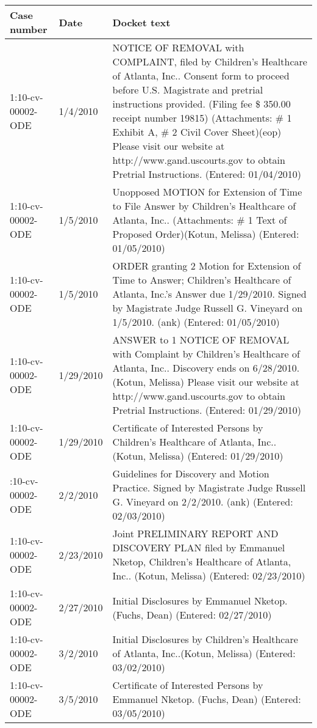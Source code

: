 
\begin{longtable}{ll>{\raggedright\arraybackslash}p{30em}}
\toprule
Case number & Date & Docket text\\
\midrule
1:10-cv-00002-ODE & 1/4/2010 & NOTICE OF REMOVAL with COMPLAINT, filed by Children's Healthcare of Atlanta, Inc.. Consent form to proceed before U.S. Magistrate and pretrial instructions provided. (Filing fee \$ 350.00 receipt number 19815) (Attachments: \# 1 Exhibit A, \# 2 Civil Cover Sheet)(eop) Please visit our website at http://www.gand.uscourts.gov to obtain Pretrial Instructions. (Entered: 01/04/2010)\\
1:10-cv-00002-ODE & 1/5/2010 & Unopposed MOTION for Extension of Time to File Answer by Children's Healthcare of Atlanta, Inc.. (Attachments: \# 1 Text of Proposed Order)(Kotun, Melissa) (Entered: 01/05/2010)\\
1:10-cv-00002-ODE & 1/5/2010 & ORDER granting 2 Motion for Extension of Time to Answer; Children's Healthcare of Atlanta, Inc.'s Answer due 1/29/2010. Signed by Magistrate Judge Russell G. Vineyard on 1/5/2010. (ank) (Entered: 01/05/2010)\\
1:10-cv-00002-ODE & 1/29/2010 & ANSWER to 1 NOTICE OF REMOVAL with Complaint by Children's Healthcare of Atlanta, Inc.. Discovery ends on 6/28/2010.(Kotun, Melissa) Please visit our website at http://www.gand.uscourts.gov to obtain Pretrial Instructions. (Entered: 01/29/2010)\\
1:10-cv-00002-ODE & 1/29/2010 & Certificate of Interested Persons by Children's Healthcare of Atlanta, Inc.. (Kotun, Melissa) (Entered: 01/29/2010)\\
\addlinespace
1:10-cv-00002-ODE & 2/2/2010 & Guidelines for Discovery and Motion Practice. Signed by Magistrate Judge Russell G. Vineyard on 2/2/2010. (ank) (Entered: 02/03/2010)\\
1:10-cv-00002-ODE & 2/23/2010 & Joint PRELIMINARY REPORT AND DISCOVERY PLAN filed by Emmanuel Nketop, Children's Healthcare of Atlanta, Inc.. (Kotun, Melissa) (Entered: 02/23/2010)\\
1:10-cv-00002-ODE & 2/27/2010 & Initial Disclosures by Emmanuel Nketop.(Fuchs, Dean) (Entered: 02/27/2010)\\
1:10-cv-00002-ODE & 3/2/2010 & Initial Disclosures by Children's Healthcare of Atlanta, Inc..(Kotun, Melissa) (Entered: 03/02/2010)\\
1:10-cv-00002-ODE & 3/5/2010 & Certificate of Interested Persons by Emmanuel Nketop. (Fuchs, Dean) (Entered: 03/05/2010)\\

\end{longtable}
